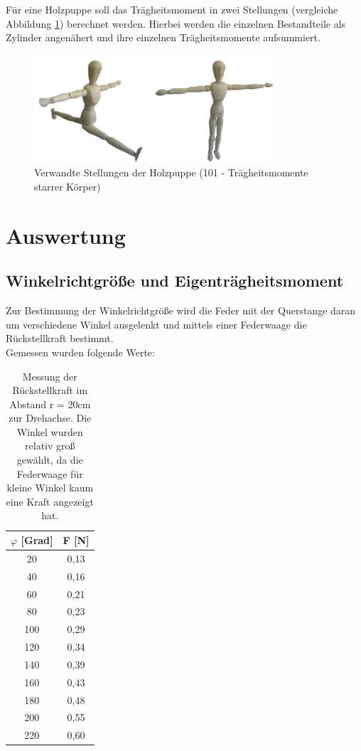 Für eine Holzpuppe soll das Trägheitsmoment in zwei Stellungen (vergleiche Abbildung \ref{pic_puppe}) berechnet werden. Hierbei werden
die einzelnen Bestandteile als Zylinder angenähert und ihre einzelnen Trägheitsmomente aufsummiert.

\begin{figure}[H]
\includegraphics[width=0.8\textwidth]{pics/puppe.png}
\caption{Verwandte Stellungen der Holzpuppe (101 - Trägheitsmomente starrer Körper)}
\label{pic_puppe}
\end{figure}






\section{Auswertung}
\subsection{Winkelrichtgröße und Eigenträgheitsmoment}
Zur Bestimmung der Winkelrichtgröße wird die Feder mit der Querstange daran um verschiedene Winkel ausgelenkt und mittels einer Federwaage die Rückstellkraft bestimmt.\\
Gemessen wurden folgende Werte:
\begin{table}[htbp]
\begin{tabular}{|c|c|}
\hline 
$\varphi$ [Grad]&	F [N]\\ \hline
20	&0,13\\ \hline
40	&0,16\\ \hline
60	&0,21\\ \hline
80	&0,23\\ \hline
100	&0,29\\ \hline
120	&0,34\\ \hline
140	&0,39\\ \hline
160	&0,43\\ \hline
180	&0,48\\ \hline
200	&0,55\\ \hline
220	&0,60\\ \hline
\end{tabular} 
\caption{Messung der Rückstellkraft im Abstand r = 20cm zur Drehachse. Die Winkel wurden relativ groß gewählt, da die Federwaage für kleine Winkel kaum eine Kraft angezeigt hat.}
\end{table}

